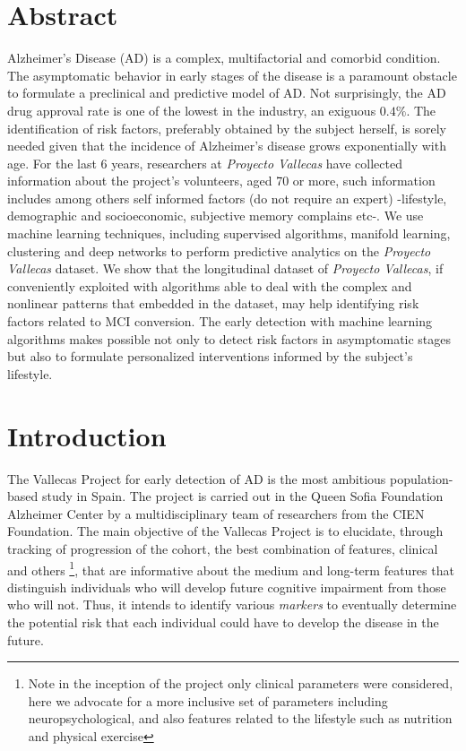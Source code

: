 \documentclass[11pt]{article}
\begin{document}
\section*{Abstract}
Alzheimer's Disease (AD) is a complex, multifactorial and comorbid condition. The asymptomatic behavior in early stages of the disease is a paramount obstacle to formulate a preclinical and predictive model of AD. Not surprisingly, the AD drug approval rate is one of the lowest in the industry, an exiguous $0.4\%$. The identification of risk factors, preferably obtained by the subject herself, is sorely needed given that the incidence of Alzheimer’s disease grows exponentially with age. 
For the last 6 years, researchers at \emph{Proyecto Vallecas} have collected information about the project's volunteers, aged 70 or more, such information includes among others self informed factors (do not require an expert) -lifestyle, demographic and socioeconomic, subjective memory complains etc-. 
We use machine learning techniques, including supervised algorithms, manifold learning, clustering and deep networks to perform predictive analytics on the \emph{Proyecto Vallecas} dataset.
We show that the longitudinal dataset of \emph{Proyecto Vallecas}, if conveniently exploited with algorithms able to deal with the complex and nonlinear patterns that embedded in the dataset, may help identifying risk factors related to MCI conversion.
The early detection with machine learning algorithms makes possible not only to detect risk factors in asymptomatic  stages but also to formulate personalized interventions informed by the subject's lifestyle.

\section{Introduction}
The Vallecas Project for early detection of AD is the most ambitious population-based study in Spain. The project is carried out in the Queen Sofia Foundation Alzheimer Center by a multidisciplinary team of researchers from the CIEN Foundation. The main objective of the Vallecas Project is to elucidate, through tracking of progression of the cohort, the best combination of features, clinical and others \footnote{Note in the inception of the project only clinical parameters were considered, here we advocate for a more inclusive set of parameters including neuropsychological, and also features related to the lifestyle such as nutrition and physical exercise}, that are informative about the medium and long-term features that distinguish individuals who will develop future cognitive impairment from those who will not. Thus, it intends to identify various \emph{markers} to eventually determine the potential risk that each individual could have to develop the disease in the future.
\end{document}
